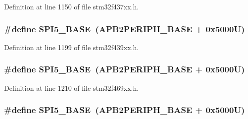 Definition at line 1150 of file stm32f437xx.\+h.

\subsubsection[{\texorpdfstring{S\+P\+I5\+\_\+\+B\+A\+SE}{SPI5_BASE}}]{\setlength{\rightskip}{0pt plus 5cm}\#define S\+P\+I5\+\_\+\+B\+A\+SE~({\bf A\+P\+B2\+P\+E\+R\+I\+P\+H\+\_\+\+B\+A\+SE} + 0x5000\+U)}\hypertarget{group___peripheral__memory__map_gac1c58d33414e167d478ecd0e31331dfa}{}\label{group___peripheral__memory__map_gac1c58d33414e167d478ecd0e31331dfa}


Definition at line 1199 of file stm32f439xx.\+h.

\subsubsection[{\texorpdfstring{S\+P\+I5\+\_\+\+B\+A\+SE}{SPI5_BASE}}]{\setlength{\rightskip}{0pt plus 5cm}\#define S\+P\+I5\+\_\+\+B\+A\+SE~({\bf A\+P\+B2\+P\+E\+R\+I\+P\+H\+\_\+\+B\+A\+SE} + 0x5000\+U)}\hypertarget{group___peripheral__memory__map_gac1c58d33414e167d478ecd0e31331dfa}{}\label{group___peripheral__memory__map_gac1c58d33414e167d478ecd0e31331dfa}


Definition at line 1210 of file stm32f469xx.\+h.

\subsubsection[{\texorpdfstring{S\+P\+I5\+\_\+\+B\+A\+SE}{SPI5_BASE}}]{\setlength{\rightskip}{0pt plus 5cm}\#define S\+P\+I5\+\_\+\+B\+A\+SE~({\bf A\+P\+B2\+P\+E\+R\+I\+P\+H\+\_\+\+B\+A\+SE} + 0x5000\+U)}\hypertarget{group___peripheral__memory__map_gac1c58d33414e167d478ecd0e31331dfa}{}\label{group___peripheral__memory__map_gac1c58d33414e167d478ecd0e31331dfa}


